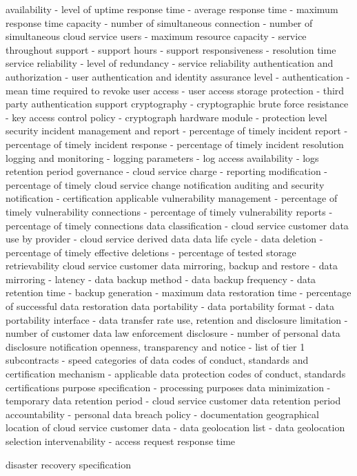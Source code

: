 \documentclass[12pt,a4paper,oneside]{report}
\begin{document}
\begin{center}
availability
 - level of uptime
response time
 - average response time
 - maximum response time
capacity
 - number of simultaneous connection
 - number of simultaneous cloud service users
 - maximum resource capacity
 - service throughout 
support
 - support hours
 - support responsiveness
 - resolution time
service reliability
 - level of redundancy
 - service reliability
authentication and authorization
 - user authentication and identity assurance level
 - authentication
 - mean time required to revoke user access
 - user access storage protection
 - third party authentication support
cryptography
 - cryptographic brute force resistance 
 - key access control policy
 - cryptograph  hardware module
 - protection level
security incident management and report
 - percentage of timely incident report
 - percentage of timely incident response
 - percentage of timely incident resolution
logging and monitoring
 - logging parameters
 - log access availability
 - logs retention period
governance
 - cloud service charge
 - reporting modification
 - percentage of timely cloud service change notification
auditing and security notification
 - certification applicable
vulnerability management
 - percentage of timely vulnerability connections
 - percentage of timely vulnerability reports
- percentage of timely connections
data classification
 - cloud service customer data use by provider
 - cloud service derived data
data life cycle
 - data deletion
 - percentage of timely effective deletions
 - percentage of tested storage retrievability 
cloud service customer data mirroring, backup and restore
 - data mirroring
 - latency
 - data backup method 
 - data backup frequency
 - data retention time
 - backup generation
 - maximum data restoration time
 - percentage of successful data restoration
data portability
 - data portability format
 - data portability interface
 - data transfer rate
use, retention and disclosure limitation
 - number of customer data law enforcement disclosure 
 - number of personal data disclosure notification
openness, transparency and notice
 - list of tier 1 subcontracts
 - speed categories of data 
codes of conduct, standards and certification mechanism 
 - applicable data protection codes of conduct, standards certifications
purpose specification
  - processing purposes
data minimization
 - temporary data retention period
 - cloud service customer data retention period
accountability
 - personal data breach policy
 - documentation
geographical location of cloud service customer data
 - data geolocation list
 - data geolocation selection
intervenability
 - access request response time

disaster recovery specification

\end{center}
\end{document}
